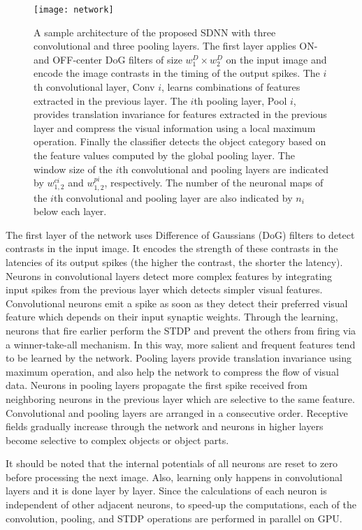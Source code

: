 \documentclass[preprint,5p,12pt,twocolumn]{article}
\begin{document}
\begin{figure*}[!h]
\centering
\texttt{[image: network]}
\caption{ A sample architecture of the proposed SDNN with three convolutional and three pooling layers. The first layer applies ON- and OFF-center DoG filters of size $w_{1}^{D} \times w_{2}^{D}$  on the input image and encode the image contrasts in the timing of the output spikes. The $i$th convolutional layer, Conv $i$, learns combinations of features extracted in the previous layer. The $i$th pooling layer, Pool $i$, provides translation invariance for features extracted in the previous layer and compress the visual information using a local maximum operation. Finally the classifier detects the object category based on the feature values computed by the global pooling layer. The window size of the $i$th convolutional and pooling layers are indicated by $w_{1,2}^{ci}$ and $w_{1,2}^{pi}$, respectively. The number of the neuronal maps of the $i$th convolutional and pooling layer are also indicated by $n_{i}$ below each layer.}
\label{fig-network}
\end{figure*}

The first layer of the network uses Difference of Gaussians (DoG) filters to detect contrasts in the input image. It encodes the strength of these contrasts in the latencies of its output spikes (the higher the contrast, the shorter the latency). Neurons in convolutional layers detect more complex features by integrating input spikes from the previous layer which detects simpler visual features. Convolutional neurons emit a spike as soon as they detect their preferred visual feature which depends on their input synaptic weights. Through the learning, neurons that fire earlier perform the STDP and prevent the others from firing via a winner-take-all mechanism. In this way, more salient and frequent features tend to be learned by the network.  Pooling layers provide translation invariance using maximum operation, and also help the network to compress the flow of visual data. Neurons in pooling layers propagate the first spike received from neighboring neurons in the previous layer which are selective to the same feature. Convolutional and pooling layers are arranged in a consecutive order. Receptive fields gradually increase through the network and neurons in higher layers become selective to complex objects or object parts.

It should be noted that the internal potentials of all neurons are reset to zero before processing the next image. Also, learning only happens in convolutional layers and it is done layer by layer. Since the calculations of each neuron is independent of other adjacent neurons, to speed-up the computations, each of the convolution, pooling, and STDP operations are performed in parallel on GPU.
\end{document}
